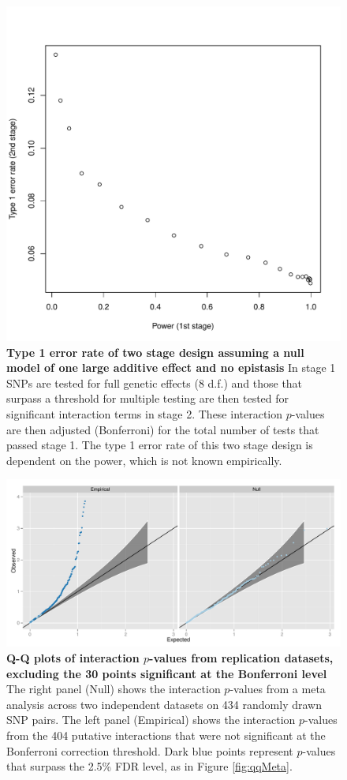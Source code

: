 \documentclass{article}
\begin{document}
\begin{figure}[H]
	\centering
	\includegraphics[width=5in]{type1}
	\caption{\textbf{Type 1 error rate of two stage design assuming a null model of one large additive effect and no epistasis} In stage 1 SNPs are tested for full genetic effects (8 d.f.) and those that surpass a threshold for multiple testing are then tested for significant interaction terms in stage 2. These interaction $p$-values are then adjusted (Bonferroni) for the total number of tests that passed stage 1. The type 1 error rate of this two stage design is dependent on the power, which is not known empirically.}
\label{fig:type1}
\end{figure}
\clearpage

\begin{figure}[H]
	\centering
	\includegraphics[width=5in]{qqMetaNonsig}
	\caption{\textbf{Q-Q plots of interaction $p$-values from replication datasets, excluding the 30 points significant at the Bonferroni level} The right panel (Null) shows the interaction $p$-values from a meta analysis across two independent datasets on 434 randomly drawn SNP pairs. The left panel (Empirical) shows the interaction $p$-values from the 404 putative interactions that were not significant at the Bonferroni correction threshold. Dark blue points represent $p$-values that surpass the 2.5\% FDR level, as in Figure \ref{fig:qqMeta}.}
\label{fig:qqMetaNonsig}
\end{figure}
\clearpage
\end{document}
